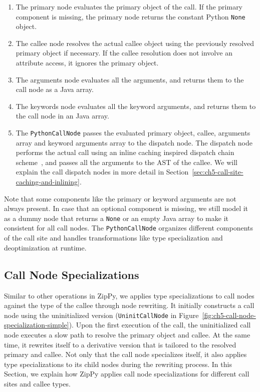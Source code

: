 \begin{enumerate}

\item The primary node evaluates the primary object of the call.
If the primary component is missing, the primary node returns the constant Python \texttt{None} object.

\item The callee node resolves the actual callee object using the previously resolved primary object if necessary.
If the callee resolution does not involve an attribute access, it ignores the primary object.

\item The arguments node evaluates all the arguments, and returns them to the call node as a Java array.

\item The keywords node evaluates all the keyword arguments, and returns them to the call node in an Java array.

\item The \texttt{PythonCallNode} passes the evaluated primary object, callee, arguments array and keyword arguments array to the dispatch node.
The dispatch node performs the actual call using an inline caching inspired dispatch chain scheme~\cite{Deutsch1984, holzle1991}, and passes all the arguments to the AST of the callee.
We will explain the call dispatch nodes in more detail in Section~\ref{sec:ch5-call-site-caching-and-inlining}.

\end{enumerate}

Note that some components like the primary or keyword arguments are not always present.
In case that an optional component is missing, we still model it as a dummy node that returns a \texttt{None} or an empty Java array to make it consistent for all call nodes.
The \texttt{PythonCallNode} organizes different components of the call site and handles transformations like type specialization and deoptimization at runtime.

\subsection{Call Node Specializations}

Similar to other operations in ZipPy, we applies type specializations to call nodes against the type of the callee through node rewriting.
It initially constructs a call node using the uninitialized version (\texttt{UninitCallNode} in Figure~\ref{fig:ch5-call-node-specialization-simple}).
Upon the first execution of the call, the uninitialized call node executes a slow path to resolve the primary object and callee.
At the same time, it rewrites itself to a derivative version that is tailored to the resolved primary and callee.
Not only that the call node specializes itself, it also applies type specializations to its child nodes during the rewriting process.
In this Section, we explain how ZipPy applies call node specializations for different call sites and callee types.

